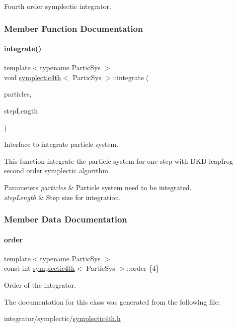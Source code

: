 Fourth order symplectic integrator. 

\subsubsection{Member Function Documentation}
\mbox{\label{classsymplectic4th_aa4fc1444804ed2effb0033a3cb5056e4}} 
\paragraph{\texorpdfstring{integrate()}{integrate()}}
{\footnotesize\ttfamily template$<$typename Partic\+Sys $>$ \\
void \mbox{\hyperlink{classsymplectic4th}{symplectic4th}}$<$ Partic\+Sys $>$\+::integrate (\begin{DoxyParamCaption}\item[{Partic\+Sys \&}]{particles,  }\item[{double}]{step\+Length }\end{DoxyParamCaption})}



Interface to integrate particle system. 

This function integrate the particle system for one step with D\+KD leapfrog second order symplectic algorithm. 
\begin{DoxyParams}{Parameters}
{\em particles} & Particle system need to be integrated. \\
\hline
{\em step\+Length} & Step size for integration. \\
\hline
\end{DoxyParams}


\subsubsection{Member Data Documentation}
\mbox{\label{classsymplectic4th_a44427b7e9dab1a2241071d1cc639ebe4}} 
\paragraph{\texorpdfstring{order}{order}}
{\footnotesize\ttfamily template$<$typename Partic\+Sys $>$ \\
const int \mbox{\hyperlink{classsymplectic4th}{symplectic4th}}$<$ Partic\+Sys $>$\+::order \{4\}\hspace{0.3cm}{\ttfamily [static]}}



Order of the integrator. 



The documentation for this class was generated from the following file\+:\begin{DoxyCompactItemize}
\item 
integrator/symplectic/\mbox{\hyperlink{symplectic4th_8h}{symplectic4th.\+h}}\end{DoxyCompactItemize}
